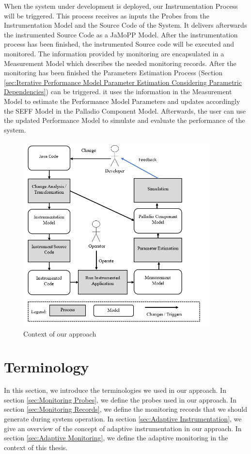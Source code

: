When the system under development is deployed, our Instrumentation Process will be triggered. This process receives as inputs the Probes from the Instrumentation Model and the Source Code of the System. It delivers afterwards the instrumented Source Code as a JaMoPP Model. After the instrumentation process has been finished, the instrumented Source code will be executed and monitored.  The information provided by monitoring are encapsulated in a Measurement Model which describes the needed monitoring records.  After the monitoring has been finished the Parameters Estimation Process (Section \ref{sec:Iterative Performance Model Parameter Estimation Considering Parametric Dependencies}) can be triggered. it uses the information in the Measurement Model to estimate the Performance Model Parameters and updates accordingly the SEFF Model in the Palladio Component Model. Afterwards, the user can use the updated Performance Model to simulate and evaluate the performance of the system. 


\begin{figure}[h]
\centering
\includegraphics[width=0.9\textwidth]{figures/approach_context}
\caption{Context of our approach}
\label{fig:Context of our approach}
\end{figure}

\section{Terminology}
\label{sec:Terminology}
In this section, we introduce the terminologies we used in our approach. In section \ref{sec:Monitoring Probes}, we define the probes used in our approach. In section \ref{sec:Monitoring Records}, we define the monitoring records that we should generate during system operation. In section \ref{sec:Adaptive Instrumentation}, we give an overview of the concept of adaptive instrumentation in our approach. In section \ref{sec:Adaptive Monitoring}, we define the adaptive monitoring in the context of this thesis.

